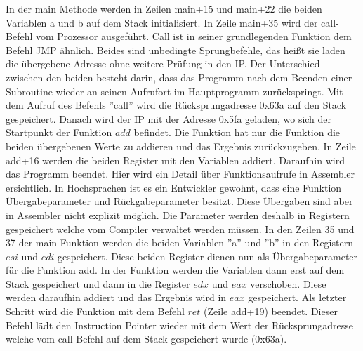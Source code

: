 \documentclass[a4paper,12pt]{article}
\begin{document}
\par\smallskip\noindent In der main Methode werden in Zeilen main+15 und main+22 die beiden Variablen a und b auf dem Stack initialisiert. In Zeile main+35 wird der call-Befehl vom Prozessor ausgeführt. Call ist in seiner grundlegenden Funktion dem Befehl JMP ähnlich. Beides sind unbedingte Sprungbefehle, das heißt sie laden die übergebene Adresse ohne weitere Prüfung in den IP. Der Unterschied zwischen den beiden besteht darin, dass das Programm nach dem Beenden einer Subroutine wieder an seinen Aufrufort im Hauptprogramm zurückspringt. Mit dem Aufruf des Befehls ''call'' wird die Rücksprungadresse 0x63a auf den Stack gespeichert. Danach wird der IP mit der Adresse 0x5fa geladen, wo sich der Startpunkt der Funktion $add$ befindet. Die Funktion hat nur die Funktion die beiden übergebenen Werte zu addieren und das Ergebnis zurückzugeben. In Zeile add+16 werden die beiden Register mit den Variablen addiert. Daraufhin wird das Programm beendet. Hier wird ein Detail über Funktionsaufrufe in Assembler ersichtlich. In Hochsprachen ist es ein Entwickler gewohnt, dass eine Funktion Übergabeparameter und Rückgabeparameter besitzt. Diese Übergaben sind aber in Assembler nicht explizit möglich. Die Parameter werden deshalb in Registern gespeichert welche vom Compiler verwaltet werden müssen. In den Zeilen 35 und 37 der main-Funktion werden die beiden Variablen ''a'' und ''b'' in den Registern $esi$ und $edi$ gespeichert. Diese beiden Register dienen nun als Übergabeparameter für die Funktion add. In der Funktion werden die Variablen dann erst auf dem Stack gespeichert und dann in die Register $edx$ und $eax$ verschoben. Diese werden daraufhin addiert und das Ergebnis wird in $eax$ gespeichert. Als letzter Schritt wird die Funktion mit dem Befehl $ret$ (Zeile add+19) beendet. Dieser Befehl lädt den Instruction Pointer wieder mit dem Wert der Rücksprungadresse welche vom call-Befehl auf dem Stack gespeichert wurde (0x63a).
\end{document}
